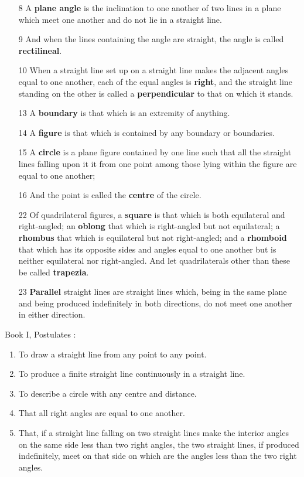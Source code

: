 \documentclass{article}
\begin{document}
\begin{itemize}
\item[8] A \textbf{plane angle} is the inclination to one another of
two lines in a plane which meet one another and do not lie in
a straight line.

\item[9] And when the lines containing the angle are straight,
the angle is called \textbf{rectilineal}.

\item[10] When a straight line set up on a straight line makes
the adjacent angles equal to one another, each of the equal
angles is \textbf{right}, and the straight line standing on the other is
called a \textbf{perpendicular} to that on which it stands.

\item[13] A \textbf{boundary} is that which is an extremity of anything.

\item[14] A \textbf{figure} is that which is contained by any boundary
or boundaries.

\item[15] A \textbf{circle} is a plane figure contained by one line
such that all the straight lines falling upon it it from one point among
those lying within the figure are equal to one another;

\item[16] And the point is called the \textbf{centre} of the circle.

\item[22] Of quadrilateral figures, a \textbf{square} is that which is
both equilateral and right-angled; an \textbf{oblong} that which is
right-angled but not equilateral; a \textbf{rhombus} that which is
equilateral but not right-angled; and a \textbf{rhomboid} that which
has its opposite sides and angles equal to one another but is
neither equilateral nor right-angled. And let quadrilaterals
other than these be called \textbf{trapezia}.

\item[23] \textbf{Parallel} straight lines are straight lines which,
being in the same plane and being produced indefinitely in
both directions, do not meet one another in either direction.
\end{itemize}

Book I, Postulates \cite[pp.~154--155]{euclidI}:

\begin{enumerate}
\item To draw a straight line from any point to any point.
\item To produce a finite straight line continuously in a
straight line.
\item To describe a circle with any centre and distance.
\item That all right angles are equal to one another.
\item That, if a straight line falling on two straight lines
make the interior angles on the same side less than two right
angles, the two straight lines, if produced indefinitely, meet
on that side on which are the angles less than the two right
angles.
\end{enumerate}
\end{document}
